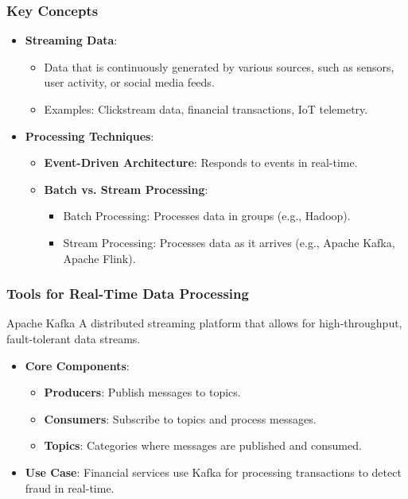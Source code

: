 \documentclass[aspectratio=169]{beamer}
\begin{document}
\begin{frame}[fragile]
    \frametitle{Key Concepts}
    \begin{itemize}
        \item \textbf{Streaming Data}:
        \begin{itemize}
            \item Data that is continuously generated by various sources, such as sensors, user activity, or social media feeds.
            \item Examples: Clickstream data, financial transactions, IoT telemetry.
        \end{itemize}
        
        \item \textbf{Processing Techniques}:
        \begin{itemize}
            \item \textbf{Event-Driven Architecture}: Responds to events in real-time.
            \item \textbf{Batch vs. Stream Processing}:
            \begin{itemize}
                \item Batch Processing: Processes data in groups (e.g., Hadoop).
                \item Stream Processing: Processes data as it arrives (e.g., Apache Kafka, Apache Flink).
            \end{itemize}
        \end{itemize}
    \end{itemize}
\end{frame}

\begin{frame}[fragile]
    \frametitle{Tools for Real-Time Data Processing}
    \begin{block}{Apache Kafka}
        A distributed streaming platform that allows for high-throughput, fault-tolerant data streams.
        \begin{itemize}
            \item \textbf{Core Components}:
            \begin{itemize}
                \item \textbf{Producers}: Publish messages to topics.
                \item \textbf{Consumers}: Subscribe to topics and process messages.
                \item \textbf{Topics}: Categories where messages are published and consumed.
            \end{itemize}
            \item \textbf{Use Case}: Financial services use Kafka for processing transactions to detect fraud in real-time.
        \end{itemize}
    \end{block}
\end{frame}
\end{document}
